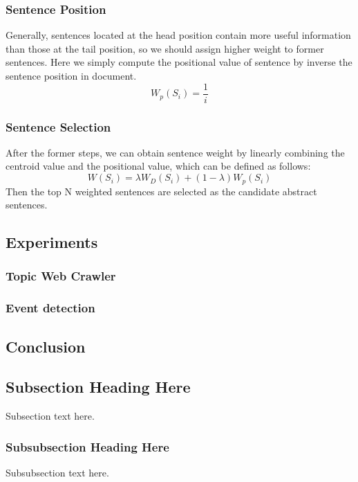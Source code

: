 \documentclass[conference]{IEEEtran}
\begin{document}
\subsubsection{Sentence Position}
Generally, sentences located at the head position contain more useful information than those at the tail position, so we should assign higher weight to former sentences. Here we simply compute the positional value of sentence by inverse the sentence position in document.
\begin{equation}
W_p(S_i) = \frac{1}{i}
\end{equation}

\subsubsection{Sentence Selection}
After the former steps, we can obtain sentence weight by linearly combining the centroid value and the positional value, which can be defined as follows:
\begin{equation}
W(S_i) = \lambda W_D(S_i) + (1- \lambda) W_p(S_i)
\end{equation}
Then the top N weighted sentences are selected as the candidate abstract sentences. 

\subsection{Experiments}

\subsubsection{Topic Web Crawler}


\subsubsection{Event detection}



\subsection{Conclusion}


\subsection{Subsection Heading Here}
Subsection text here.


\subsubsection{Subsubsection Heading Here}
Subsubsection text here.
\end{document}
